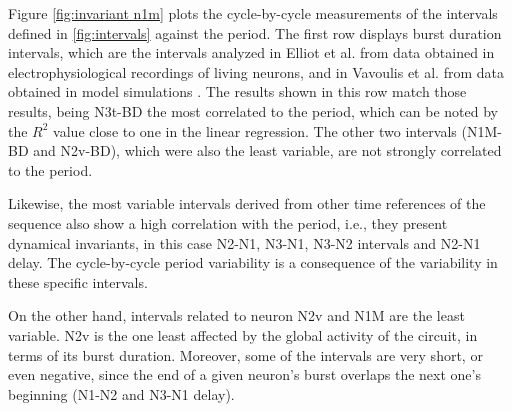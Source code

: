 Figure \ref{fig:invariant n1m} plots the cycle-by-cycle measurements of the intervals defined in \ref{fig:intervals} against the period. The first row displays burst duration intervals, which are the intervals analyzed in Elliot et al. \cite{Elliott1991} from data obtained in electrophysiological recordings of living neurons, and in Vavoulis et al. from data obtained in model simulations \cite{Vavoulis2007}. The results shown in this row match those results, being N3t-BD the most correlated to the period, which can be noted by the $R^2$ value close to one in the linear regression. The other two intervals (N1M-BD and N2v-BD), which were also the least variable, are not strongly correlated to the period. 



Likewise, the most variable intervals derived from other time references of the sequence also show a high correlation with the period, i.e., they present dynamical invariants, in this case N2-N1, N3-N1, N3-N2 intervals and N2-N1 delay. The cycle-by-cycle period variability is a consequence of the variability in these specific intervals.

On the other hand, intervals related to neuron N2v and N1M are the least variable. N2v is the one least affected by the global activity of the circuit, in terms of its burst duration. Moreover, some of the intervals are very short, or even negative, since the end of a given neuron's burst overlaps the next one's beginning (N1-N2 and N3-N1 delay). %


